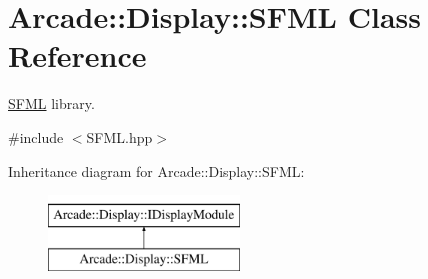 \hypertarget{classArcade_1_1Display_1_1SFML}{}\section{Arcade\+::Display\+::S\+F\+ML Class Reference}
\label{classArcade_1_1Display_1_1SFML}


\mbox{\hyperlink{classArcade_1_1Display_1_1SFML}{S\+F\+ML}} library.  




{\ttfamily \#include $<$S\+F\+M\+L.\+hpp$>$}

Inheritance diagram for Arcade\+::Display\+::S\+F\+ML\+:\begin{figure}[H]
\begin{center}
\leavevmode
\includegraphics[height=2.000000cm]{classArcade_1_1Display_1_1SFML}
\end{center}
\end{figure}
